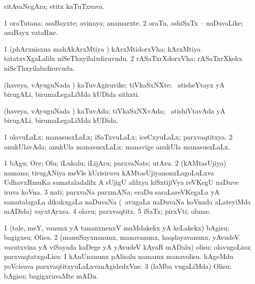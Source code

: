 \bentry
{}
\gl{\nA}
\bmng
citAvaNegAra; etitx kaTuTxvava. 
\emng
\eentry

\bentry
{}
\gl{\nA}
\bmng
\bnum
\num{1} oraTutana; asaBayxte; avinaya; anamarxte. 
\num{2} oraTu, ashiSaTx -- naDavaLike; asaBayx vataRne. 
\enum
\emng
\eentry

\bentry
{}
\gl{\nA}
\bmng
\bnum
\num{1} (phArxnisxna mahAkArxMtiya \vi) kArxMtidorxVha; kArxMtiya tatatxvXgaLalilx niSeThxyilalxdiruvudu. 
\num{2} rASaTxrXdorxVha; rASaTxrXkekx niSeThxyilalxdiruvudu. 
\enum
\emng
\eentry

\bentry
{}
\gl{\nA}
\bmng
(haveya, vAyuguNada \vi) kaTuvAgiruvike; tiVkaSxNXte; \kanmu\ atisheYtayx yA birugALi, birumaLegaLiMda kUDida sithxti. 
\emng
\eentry

\bentry
{}
\gl{\gu}
\bmng
(haveya, vAyuguNada \vi) kaTuvAda; tiVkaSxNXvAda; \kanmu\ atishiVtavAda yA birugALi, birumaLegaLiMda kUDida. 
\emng
\eentry

\bentry
{}
\gl{\gu}
\bmng
\bnum
\num{1} olavuLaLx; manasusxLaLx; iSaTxvuLaLx; iceCxyuLaLx; parxvaqtitxya. 
\num{2} anukUlavAda; anukUla manasusxLaLx:  manavige anukUla manasusxLaLx. 
\enum
\emng
\eentry

\bentry
{}
\gl{\nA}
\bmng
\bnum
\num{1} bAgu; Ore; Olu; iLukalu; iLijAru; parxvaNate; utAru. 
\num{2} (kAMtasUjiya) namana; tirugANiya meVle kUrisiruva kAMtasUjiyanonxLagoLuLxva UdhavxRmuKa samataladalilx A sUjigU alilxya kiSxtijiVya reVKegU naDuve iruva koVna. 
\num{3} nati; parxvaNa parxmANa; eraDu saraLareVKegaLa yA samatalagaLa dikukxgaLa naDuvaNa (\kanmu\ avugaLa naDuvaNa koVnada aLateyiMda mADida) vayxtAyxsa. 
\num{4} olavu; parxvaqtitx. 
\num{5} iSaTx; pirxVti; olume. 
\enum
\emng
\eentry

\bentry
{}
\gl{\sakirx}
\bmng
\bnum
\num{1} (tale, meY, \mo vanunx yA tananxnenxV muMdakekx yA keLakekx) bAgisu; bagigxsu; Olisu. 
\num{2} (manuSayxnanunx, manavanunx, haqdayavanunx, yAvudeV vasutxvina yA viSayada kaDege yA yAvudeV kAyaR mADalu) olisu; olavugoLisu; parxvaqtatxgoLisu:  I kAnUnanunx pAlisalu namamx manavolisu.  hAgeMdu yoVcisuva parxvaqtitxyuLaLxvanAgidedxVne. 
\num{3} (laMba \mo vugaLiMda) Olisu; bAgisu; bagigxruvaMte mADu. 
\enum
\emng

